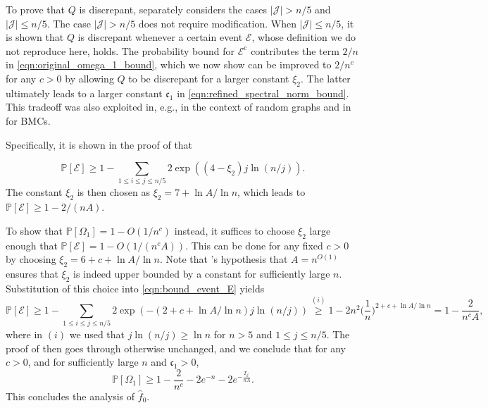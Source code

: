 \documentclass[11pt]{article}
\newcommand{\mf}[1]{\mathfrak{#1}}
\newcommand{\mcE}{\mathcal{E}}
\newcommand{\mbbP}{\mathbb{P}}
\theoremstyle{definition}
\theoremstyle{definition}
\begin{document}
To prove that $Q$ is discrepant, \cite{Jedra:2022} separately considers the cases $|\mathcal{J}|> n/5$ and $|\mathcal{J}|\leq n/5$.
The case $|\mathcal{J}|> n/5$ does not require modification.
When $|\mathcal{J}|\leq n/5$, it is shown that $Q$ is discrepant whenever a certain event $\mcE$, whose definition we do not reproduce here, holds.
The probability bound for $\mcE^{\mathrm{c}}$ contributes the term $2/n$ in \eqref{eqn:original_omega_1_bound}, which we now show can be improved to $2/n^c$ for any $c>0$ by allowing $Q$ to be discrepant for a larger constant $\xi_2$.
The latter ultimately leads to a larger constant $\mf{c}_1$ in \eqref{eqn:refined_spectral_norm_bound}.
This tradeoff was also exploited in, e.g., \cite{hoffman2021spectral,ariu2023instance} in the context of random graphs and in \cite{van2024estimating} for \glspl{BMC}.

Specifically, it is shown in the proof of \cite[Lemma 18]{Jedra:2022} that

\begin{equation}
	\label{eqn:bound_event_E}
	\mbbP[\mcE]
	\geq
	1-\sum_{1\leq i\leq j\leq n/5}2\exp((4-\xi_2)j\ln (n/j)).
\end{equation}
The constant $\xi_2$ is then chosen as $\xi_2=7+\ln A/\ln n$, which leads to $\mbbP[\mcE]\geq 1-2/(nA)$.

To show that $\mbbP[\Omega_1]=1-O(1/n^c)$ instead, it suffices to choose $\xi_2$ large enough that $\mbbP[\mcE]=1-O(1/(n^cA))$.
This can be done for any fixed $c>0$ by choosing $\xi_2 = 6 + c + \ln A/\ln n$.
Note that 's hypothesis that $A = n^{O(1)}$ ensures that $\xi_2$ is indeed upper bounded by a constant for sufficiently large $n$.
Substitution of this choice into \eqref{eqn:bound_event_E} yields
\begin{equation}
	\mbbP[\mcE]
	\geq
	1-\sum_{1\leq i\leq j\leq n/5}2\exp(-(2+c+\ln A/\ln n)j\ln (n/j))
	\overset{(i)}{\geq}
	1-2n^2\biggl(\frac{1}{n}\biggr)^{2+c+\ln A/\ln n}
	=
	1-\frac{2}{n^cA},
\end{equation}
where in $(i)$ we used that $j\ln (n/j)\geq \ln n$ for $n>5$ and $1\leq j\leq n/5$.
The proof of \cite[Lemma 18]{Jedra:2022} then goes through otherwise unchanged, and we conclude that for any $c>0$, and for sufficiently large $n$ and $\mf{c}_1>0$,
\begin{equation}
	\mbbP[\Omega_1]
	\geq
	1-\frac{2}{n^c}-2e^{-n}-2e^{-\frac{T_{k^*}}{nA}}
	.
\end{equation}
This concludes the analysis of $\hat{f}_{0}$.
\end{document}
